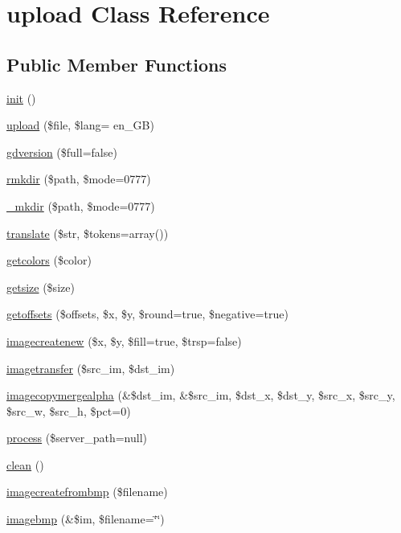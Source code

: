 \hypertarget{classupload}{}\section{upload Class Reference}
\label{classupload}
\subsection*{Public Member Functions}
\begin{DoxyCompactItemize}
\item 
\hyperlink{classupload_a4be4055f3361d4800e16bc2e2e38cda6}{init} ()
\item 
\hyperlink{classupload_af6008d2b7c3d25e816d855c141ccdd7f}{upload} (\$file, \$lang= \textquotesingle{}en\+\_\+\+G\+B\textquotesingle{})
\item 
\hyperlink{classupload_a132c46244702f024a0f6bdedb67e803d}{gdversion} (\$full=false)
\item 
\hyperlink{classupload_a6cfaa3db19fd36ff7a7fe2a059dede61}{rmkdir} (\$path, \$mode=0777)
\item 
\hyperlink{classupload_a5cf49aee8a213633ce9ac1c8548e15ec}{\+\_\+mkdir} (\$path, \$mode=0777)
\item 
\hyperlink{classupload_a83d4cc05b8b4320ad25184eaa03b7583}{translate} (\$str, \$tokens=array())
\item 
\hyperlink{classupload_a546ce0481f4246ff40b54fb65b6008f5}{getcolors} (\$color)
\item 
\hyperlink{classupload_a31a2fdb72a204eb14bde0e48f299618d}{getsize} (\$size)
\item 
\hyperlink{classupload_ad0454e04cd49b15349f5bee920219b71}{getoffsets} (\$offsets, \$x, \$y, \$round=true, \$negative=true)
\item 
\hyperlink{classupload_a34238f7983263e051fd0cd7338c947c4}{imagecreatenew} (\$x, \$y, \$fill=true, \$trsp=false)
\item 
\hyperlink{classupload_af6f31d4117ee23ec06edbbf88843fd93}{imagetransfer} (\$src\+\_\+im, \$dst\+\_\+im)
\item 
\hyperlink{classupload_a342629a11fcf58705205b3db7bb4d90b}{imagecopymergealpha} (\&\$dst\+\_\+im, \&\$src\+\_\+im, \$dst\+\_\+x, \$dst\+\_\+y, \$src\+\_\+x, \$src\+\_\+y, \$src\+\_\+w, \$src\+\_\+h, \$pct=0)
\item 
\hyperlink{classupload_a0cb7e6539460c3ae6d143f0d01bd54fb}{process} (\$server\+\_\+path=null)
\item 
\hyperlink{classupload_adb40b812890a8bc058bf6b7a0e1a54d9}{clean} ()
\item 
\hyperlink{classupload_ae31d5b4cff1e502fb0c51505e67e3e9a}{imagecreatefrombmp} (\$filename)
\item 
\hyperlink{classupload_aed5bd6799ccb006c94bf832f2279652a}{imagebmp} (\&\$im, \$filename=\char`\"{}\char`\"{})
\end{DoxyCompactItemize}
